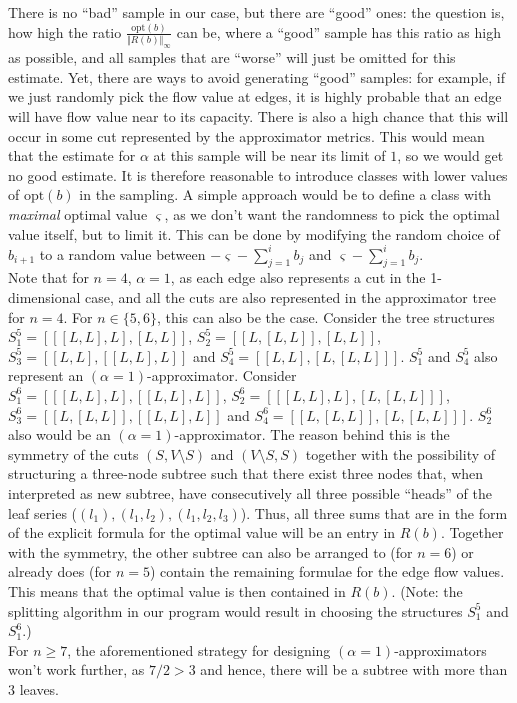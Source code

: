 There is no ``bad'' sample in our case, but there are ``good'' ones: the question is, how high the ratio $\frac{\text{opt}(b)}{\Vert R(b)\Vert_\infty}$ can be, where a ``good'' sample has this ratio as high as possible, and all samples that are ``worse'' will just be omitted for this estimate. Yet, there are ways to avoid generating ``good'' samples: for example, if we just randomly pick the flow value at edges, it is highly probable that an edge will have flow value near to its capacity. There is also a high chance that this will occur in some cut represented by the approximator metrics. This would mean that the estimate for $\alpha$ at this sample will be near its limit of $1$, so we would get no good estimate. It is therefore reasonable to introduce classes with lower values of $\text{opt}(b)$ in the sampling. A simple approach would be to define a class with \textit{maximal} optimal value $\varsigma$, as we don't want the randomness to pick the optimal value itself, but to limit it. This can be done by modifying the random choice of $b_{i+1}$ to a random value between $-\varsigma-\sum_{j=1}^ib_j$ and $\varsigma-\sum_{j=1}^ib_j$.\\
Note that for $n=4$, $\alpha=1$, as each edge also represents a cut in the 1-dimensional case, and all the cuts are also represented in the approximator tree for $n=4$. For $n\in \{5,6\}$, this can also be the case. Consider the tree structures $S_1^5=[[[L,L],L],[L,L]]$, $S_2^5=[[L,[L,L]],[L,L]]$, $S_3^5=[[L,L],[[L,L],L]]$ and $S_4^5=[[L,L],[L,[L,L]]]$. $S_1^5$ and $S_4^5$ also represent an $(\alpha=1)$-approximator. Consider $S_1^6=[[[L,L],L],[[L,L],L]]$, $S_2^6=[[[L,L],L],[L,[L,L]]]$, $S_3^6=[[L,[L,L]],[[L,L],L]]$ and $S_4^6=[[L,[L,L]],[L,[L,L]]]$. $S_2^6$ also would be an $(\alpha=1)$-approximator. The reason behind this is the symmetry of the cuts $(S,V\setminus S)$ and $(V\setminus S,S)$ together with the possibility of structuring a three-node subtree such that there exist three nodes that, when interpreted as new subtree, have consecutively all three possible ``heads'' of the leaf series ($(l_1), (l_1,l_2), (l_1,l_2,l_3)$). Thus, all three sums that are in the form of the explicit formula for the optimal value will be an entry in $R(b)$. Together with the symmetry, the other subtree can also be arranged to (for $n=6$) or already does (for $n=5$) contain the remaining formulae for the edge flow values. This means that the optimal value is then contained in $R(b)$. (Note: the splitting algorithm in our program would result in choosing the structures $S_1^5$ and $S_1^6$.)\\
For $n\geq 7$, the aforementioned strategy for designing $(\alpha=1)$-approximators won't work further, as $7/2>3$ and hence, there will be a subtree with more than $3$ leaves.
